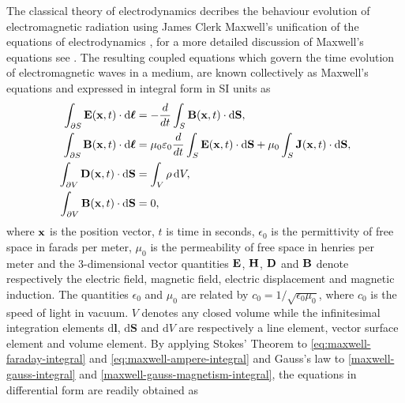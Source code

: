 The classical theory of electrodynamics decribes the behaviour evolution of electromagnetic radiation using James Clerk Maxwell's unification of the equations of electrodynamics \cite{Maxwell:1863ur}, for a more detailed discussion of Maxwell's equations see \cite{Balanis:ui,Jackson:490457}. The resulting coupled equations which govern the time evolution of electromagnetic waves in a medium, are known collectively as Maxwell's equations and expressed in integral form in SI units as
\begin{subequations}
\begin{align}
    \int_{\partial S} \mathbf{E}(\mathbf{x},t) \cdot \mathrm{d}\boldsymbol{\ell}  &= - \frac{d}{dt} \int_{S} \mathbf{B}(\mathbf{x},t) \cdot \mathrm{d}\mathbf{S}, \label{eq:maxwell-faraday-integral} \\
    \int_{\partial S} \mathbf{B}(\mathbf{x},t) \cdot \mathrm{d}\boldsymbol{\ell} &= \mu_0 \varepsilon_0 \frac{d}{dt} \int_{S} \mathbf{E}(\mathbf{x},t) \cdot \mathrm{d}\mathbf{S} +  \mu_0 \int_{S} \mathbf{J}(\mathbf{x},t) \cdot \mathrm{d}\mathbf{S}, \label{eq:maxwell-ampere-integral} \\
    \int_{\partial V} \mathbf{D}(\mathbf{x},t)\cdot\mathrm{d}\mathbf{S} &= \int_V \rho \,\mathrm{d}V, \label{maxwell-gauss-integral} \\
    \int_{\partial V} \mathbf{B}(\mathbf{x},t)\cdot\mathrm{d}\mathbf{S} &= 0, \label{maxwell-gauss-magnetism-integral}
\end{align}
\end{subequations}
where $\mathbf{x}$ is the position vector, $t$ is time in seconds, $\epsilon_0$ is the permittivity of free space in farads per meter, $\mu_0$ is the permeability of free space in henries per meter and the 3-dimensional vector quantities $\mathbf{E}$, $\mathbf{H}$, $\mathbf{D}$ and $\mathbf{B}$ denote respectively the electric field, magnetic field, electric displacement and magnetic induction. The quantities $\epsilon_0$ and $\mu_0$ are related by $c_0 = 1/ \sqrt{\epsilon_0 \mu_0}$, where $c_0$ is the speed of light in vacuum.
$V$ denotes any closed volume while the infinitesimal integration elements $\mathrm{d}\mathbf{l}$, $\mathrm{d}\mathbf{S}$ and $\mathrm{d}V$ are respectively a line element, vector surface element and volume element.
By applying Stokes' Theorem to \eqref{eq:maxwell-faraday-integral} and \eqref{eq:maxwell-ampere-integral} and Gauss's law to \eqref{maxwell-gauss-integral} and \eqref{maxwell-gauss-magnetism-integral}, the equations in differential form are readily obtained as
